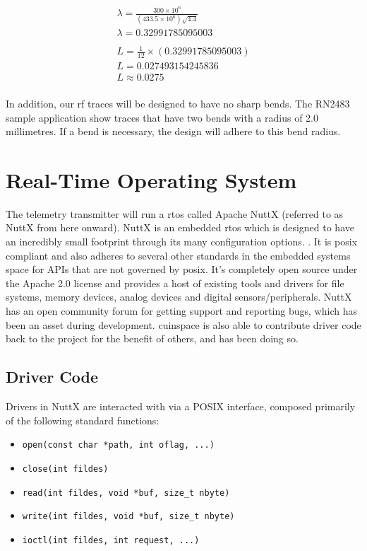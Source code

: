 \begin{gather*}
    \lambda = \frac{300 \times 10^6}{(433.5 \times 10^6)\sqrt{4.4}} \\
    \lambda = 0.32991785095003 \\
    \\
    L = \frac{1}{12} \times (0.32991785095003) \\
    L = 0.027493154245836 \\
    L \approx 0.0275 \\
\end{gather*}

In addition, our \gls{rf} traces will be designed to have no sharp bends. The RN2483 sample application show traces
that have two bends with a radius of 2.0 millimetres. \cite[Sec. 5.1]{rn2483-datasheet} If a bend is necessary, the
design will adhere to this bend radius.

\section{Real-Time Operating System}

The telemetry transmitter will run a \gls{rtos} called Apache NuttX (referred to as NuttX from here onward). NuttX is
an embedded \gls{rtos} which is designed to have an incredibly small footprint through its many configuration options.
\cite{nuttx-about}. It is \gls{posix} compliant and also adheres to several other standards in the embedded systems
space for APIs that are not governed by \gls{posix}. \cite{nuttx-about} It's completely open source under the Apache
2.0 license and provides a host of existing tools and drivers for file systems, memory devices, analog devices and
digital sensors/peripherals. NuttX has an open community forum for getting support and reporting bugs, which has been
an asset during development. \Gls{cuinspace} is also able to contribute driver code back to the project for the benefit
of others, and has been doing so.

\subsection{Driver Code}

Drivers in NuttX are interacted with via a POSIX interface, composed primarily of the following standard functions:

\begin{itemize}
    \item \texttt{open(const char *path, int oflag, ...)}
    \item \texttt{close(int fildes)}
    \item \texttt{read(int fildes, void *buf, size\_t nbyte)}
    \item \texttt{write(int fildes, void *buf, size\_t nbyte)}
    \item \texttt{ioctl(int fildes, int request, ...)}
\end{itemize}


